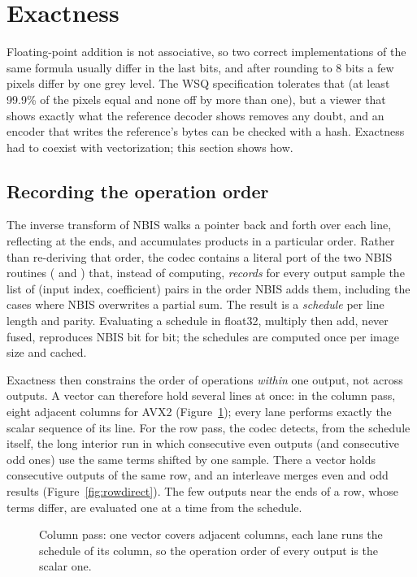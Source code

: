 \section{Exactness}
\label{sec:exactness}

Floating-point addition is not associative, so two correct implementations of the same
formula usually differ in the last bits, and after rounding to 8 bits a few pixels differ by
one grey level. The WSQ specification tolerates that (at least 99.9\% of the pixels equal and
none off by more than one), but a viewer that shows exactly what the reference decoder shows
removes any doubt, and an encoder that writes the reference's bytes can be checked with a
hash. Exactness had to coexist with vectorization; this section shows how.

\subsection{Recording the operation order}

The inverse transform of NBIS walks a pointer back and forth over each line, reflecting at the
ends, and accumulates products in a particular order. Rather than re-deriving that order, the
codec contains a literal port of the two NBIS routines ( and )
that, instead of computing, \emph{records} for every output sample the list of
(input index, coefficient) pairs in the order NBIS adds them, including the cases where NBIS
overwrites a partial sum. The result is a \emph{schedule} per line length and parity. Evaluating
a schedule in float32, multiply then add, never fused, reproduces NBIS bit for bit; the schedules
are computed once per image size and cached.

Exactness then constrains the order of operations \emph{within} one output, not across outputs.
A vector can therefore hold several lines at once: in the column pass, eight adjacent columns
for AVX2 (Figure~\ref{fig:lanes}); every lane performs exactly the scalar sequence of its line.
For the row pass, the codec detects, from the schedule itself, the long interior run in which
consecutive even outputs (and consecutive odd ones) use the same terms shifted by one sample.
There a vector holds consecutive outputs of the same row, and an interleave merges even and odd
results (Figure~\ref{fig:rowdirect}). The few outputs near the ends of a row, whose terms differ,
are evaluated one at a time from the schedule.

\begin{figure}[ht]
  \centering
  
  \caption{Column pass: one vector covers adjacent columns, each lane runs the schedule of its
  column, so the operation order of every output is the scalar one.}
  \label{fig:lanes}
\end{figure}


